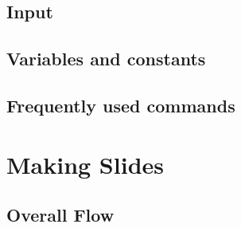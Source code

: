 \documentclass[papersize,a4paper,12pt]{article}
\begin{document}
\subsection{Input}


\subsection{Variables and constants}


\subsection{Frequently used commands}






\newpage

\section{Making Slides}

\subsection{Overall Flow}
\end{document}
